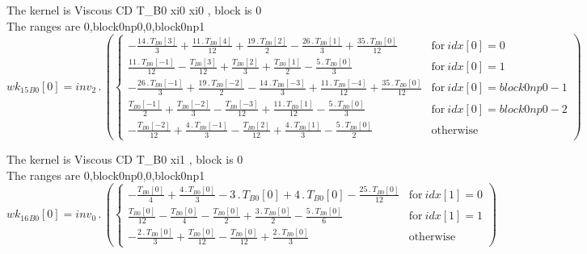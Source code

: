 \documentclass{article}
\begin{document}
\noindent The kernel is Viscous CD T_B0 xi0 xi0 , block is 0\\\noindent The ranges are 0,block0np0,0,block0np1\\\begin{dmath}{wk_{15}{_{B0}}}[{0}] = inv_2 \,.\, \left(\begin{cases} - \frac{14 \,.\, {T{_{B0}}}[{3}]}{3} + \frac{11 \,.\, {T{_{B0}}}[{4}]}{12} + \frac{19 \,.\, {T{_{B0}}}[{2}]}{2} - \frac{26 \,.\, {T{_{B0}}}[{1}]}{3} + \frac{35 \,.\, 
{T{_{B0}}}[{0}]}{12} & \text{for}\: {idx}[{0}] = 0 \\\frac{11 \,.\, {T{_{B0}}}[{-1}]}{12} - \frac{{T{_{B0}}}[{3}]}{12} + \frac{{T{_{B0}}}[{2}]}{3} + \frac{{T{_{B0}}}[{1}]}{2} - \frac{5 \,.\, {T{_{B0}}}[{0}]}{3} & \text{for}\: {idx}[{0}] = 1 \\- 
\frac{26 \,.\, {T{_{B0}}}[{-1}]}{3} + \frac{19 \,.\, {T{_{B0}}}[{-2}]}{2} - \frac{14 \,.\, {T{_{B0}}}[{-3}]}{3} + \frac{11 \,.\, {T{_{B0}}}[{-4}]}{12} + \frac{35 \,.\, {T{_{B0}}}[{0}]}{12} & \text{for}\: {idx}[{0}] = block0np0 - 1 
\\\frac{{T{_{B0}}}[{-1}]}{2} + \frac{{T{_{B0}}}[{-2}]}{3} - \frac{{T{_{B0}}}[{-3}]}{12} + \frac{11 \,.\, {T{_{B0}}}[{1}]}{12} - \frac{5 \,.\, {T{_{B0}}}[{0}]}{3} & \text{for}\: {idx}[{0}] = block0np0 - 2 \\- \frac{{T{_{B0}}}[{-2}]}{12} + \frac{4 
\,.\, {T{_{B0}}}[{-1}]}{3} - \frac{{T{_{B0}}}[{2}]}{12} + \frac{4 \,.\, {T{_{B0}}}[{1}]}{3} - \frac{5 \,.\, {T{_{B0}}}[{0}]}{2} & \text{otherwise} \end{cases}\right)\end{dmath}

\noindent The kernel is Viscous CD T_B0 xi1 , block is 0\\\noindent The ranges are 0,block0np0,0,block0np1\\\begin{dmath}{wk_{16}{_{B0}}}[{0}] = inv_0 \,.\, \left(\begin{cases} - \frac{{T{_{B0}}}[{0}]}{4} + \frac{4 \,.\, {T{_{B0}}}[{0}]}{3} - 3 \,.\, {T{_{B0}}}[{0}] + 4 \,.\, {T{_{B0}}}[{0}] - \frac{25 \,.\, {T{_{B0}}}[{0}]}{12} & \text{for}\: {idx}[{1}] = 
0 \\\frac{{T{_{B0}}}[{0}]}{12} - \frac{{T{_{B0}}}[{0}]}{4} - \frac{{T{_{B0}}}[{0}]}{2} + \frac{3 \,.\, {T{_{B0}}}[{0}]}{2} - \frac{5 \,.\, {T{_{B0}}}[{0}]}{6} & \text{for}\: {idx}[{1}] = 1 \\- \frac{2 \,.\, {T{_{B0}}}[{0}]}{3} + 
\frac{{T{_{B0}}}[{0}]}{12} - \frac{{T{_{B0}}}[{0}]}{12} + \frac{2 \,.\, {T{_{B0}}}[{0}]}{3} & \text{otherwise} \end{cases}\right)\end{dmath}
\end{document}
